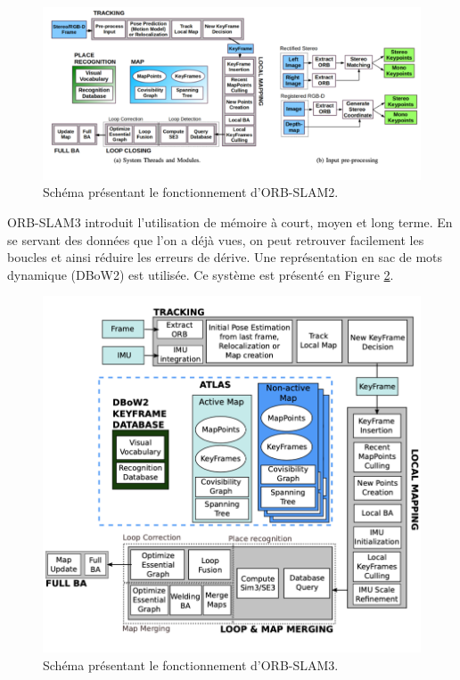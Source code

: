 \documentclass[11pt]{article}
\begin{document}
          \begin{figure}[hbt]  
            \includegraphics[width=\textwidth]{ORB_SLAM2.png}    
            \caption{Schéma présentant le fonctionnement d'ORB-SLAM2.}
            \label{fig:ORBSLAM2}
          \end{figure} 

          ORB-SLAM3 introduit l'utilisation de mémoire à court, moyen et long terme.
          En se servant des données que l'on a déjà vues, on peut retrouver
          facilement les boucles et ainsi réduire les erreurs de dérive. Une représentation en sac de mots dynamique (DBoW2) est utilisée.
          Ce système est présenté en Figure \ref{fig:ORBSLAM3}.          

          \begin{figure}[hbt]  
            \includegraphics[width=\textwidth]{ORB_SLAM3.png}    
            \caption{Schéma présentant le fonctionnement d'ORB-SLAM3.}
            \label{fig:ORBSLAM3}
          \end{figure}      
\end{document}
